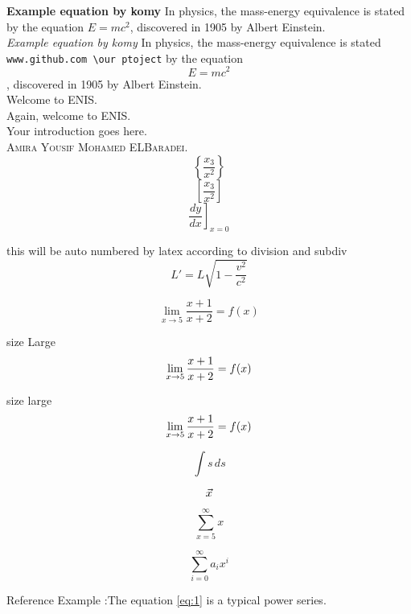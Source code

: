 \textbf{Example equation by komy} In physics, the mass-energy equivalence is stated 
by the equation $E=mc^2$, discovered in 1905 by Albert Einstein.\\
\textit{Example equation by komy} In physics, the mass-energy equivalence is stated 
\texttt{www.github.com \textbackslash our ptoject}
by the equation $$E=mc^2$$, discovered in 1905 by Albert Einstein.\\
Welcome to \Ac{ENIS}.~\\
Again, welcome to \Ac{ENIS}. ~\\
Your introduction goes here. ~\\

\textsc{Amira Yousif Mohamed ELBaradei}.\\

$$\left\{\frac{x_3}{x^2}\right\}$$
$$\left[\frac{x_3}{x^2}\right]$$
$$\left.\frac{d y}{d x}\right]_{x=0}$$

this will be auto numbered by latex according to division and subdiv
\begin{equation}
L' = {L}{\sqrt{1-\frac{v^2}{c^2}}}
\end{equation}

\begin{equation}
\lim \limits_{x \to 5} \frac{x+1}{x+2}  = f(x)
\end{equation}

size Large
\begin{equation}
\Large \lim \limits_{x \to 5} \frac{x+1}{x+2}  = f(x)
\end{equation}

size large
\begin{equation}
\large \lim \limits_{x \to 5} \frac{x+1}{x+2}  = f(x)
\end{equation}

\begin{equation}
\displaystyle{\int s \, ds}
\end{equation}

\begin{equation}
\Large \vec{x}
\end{equation}

\begin{equation}
\displaystyle {\sum \limits_{x = 5} ^{\infty} x}
\end{equation}

\begin{equation} \label{eq:1}
\sum_{i=0}^{\infty} a_i x^i
\end{equation}
 
Reference Example :The equation \ref{eq:1} is a typical power series.